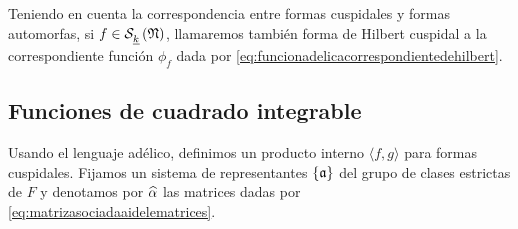 %
% 

Teniendo en cuenta la correspondencia entre formas cuspidales y formas
automorfas, si $f\in\spitzH{k}{\frak{N}}$, llamaremos tambi\'{e}n forma de
Hilbert cuspidal a la correspondiente funci\'{o}n $\phi_{f}$ dada por
\eqref{eq:funcionadelicacorrespondientedehilbert}.

\subsection{Funciones de cuadrado integrable}%
	\label{subsec:enlosadelescuadradointegrable}
Usando el lenguaje ad\'{e}lico, definimos un producto interno
$\langle f,g\rangle$ para formas cuspidales. Fijamos un sistema de
representantes $\{\frak{a}\}$ del grupo de clases estrictas de $F$ y denotamos
por $\hhat{\alpha}$ las matrices dadas por
\eqref{eq:matrizasociadaaidelematrices}.

